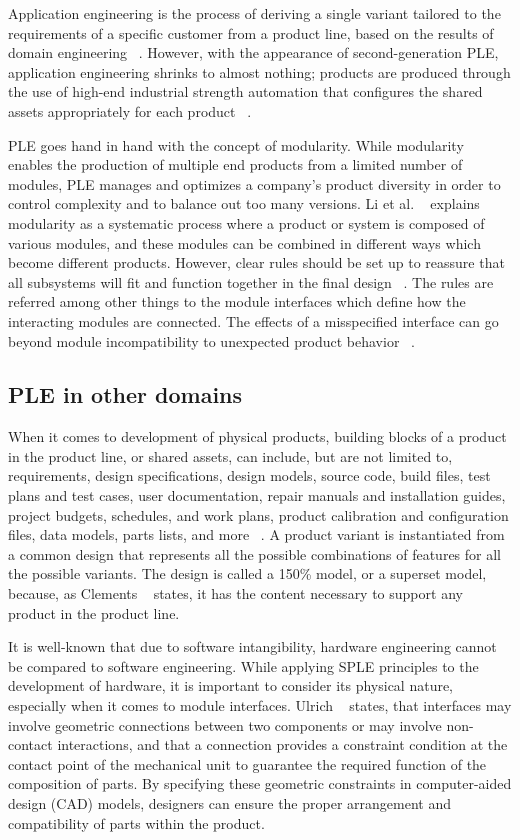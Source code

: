 \documentclass[sigconf,review]{acmart}
\begin{document}
Application engineering is the process of deriving a single variant tailored to the requirements of a specific customer from a product line, based on the results of domain engineering ~\cite{Kästner_2013}. 
However, with the appearance of second-generation PLE, application engineering shrinks to almost nothing; products are produced through the use of high-end industrial strength automation that configures the shared assets appropriately for each product ~\cite{Krueger_2013}.

PLE goes hand in hand with the concept of modularity. While modularity enables the production of multiple end products from a limited number of modules, PLE manages and optimizes a company's product diversity in order to control complexity and to balance out too many versions.
Li et al. ~\cite{Li_2019} explains modularity as a systematic process where a product or system is composed of various modules, and these modules can be combined in different ways which become different products. However, clear rules should be set up to reassure that all subsystems will fit and function together in the final design ~\cite{Baldwin_2003}. The rules are referred among other things to the module interfaces which define how the interacting modules are connected. The effects of a misspecified interface can go beyond
module incompatibility to unexpected product behavior ~\cite{Parslov_2015}. 

\subsection{PLE in other domains}
\label{sec:ple-other}

When it comes to development of physical products, building blocks of a product in the product line, or shared assets, can include, but are not limited to, requirements, design specifications, design models, source code, build files, test plans and test cases, user documentation, repair manuals and installation guides, project budgets, schedules, and work plans, product calibration and configuration files, data models, parts lists, and more ~\cite{Clements_2015}. 
A product variant is instantiated from a common design that represents all the possible combinations of features for all the possible variants. The design is called a 150\% model, or a superset model, because, as Clements ~\cite{Clements_2015} states, it has the content necessary to support any product in the product line. 

It is well-known that due to software intangibility, hardware engineering cannot be compared to software engineering. 
While applying SPLE principles to the development of hardware, it is important to consider its physical nature, especially when it comes to module interfaces. 
Ulrich ~\cite{Ulrich_1995} states, that interfaces may involve geometric connections between two components or may involve non-contact interactions,  
and that a connection provides a constraint condition at the contact point of the mechanical unit to guarantee the required function of the composition of parts. 
By specifying these geometric constraints in computer-aided design (CAD) models, designers can ensure the proper arrangement and compatibility of parts within the product.
\end{document}

